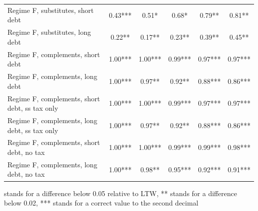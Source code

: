 \documentclass[letterpaper,12pt]{article}%
\begin{document}
\begin{table}[H]
\begin{threeparttable}
\begin{tabular}{l c c c c c}
     \quad Regime F, substitutes, short debt &  0.43*** & 0.51*  & 0.68*  & 0.79** & 0.81**  \\
     \quad Regime F, substitutes, long debt &  0.22**  & 0.17**  & 0.23** &  0.39**  & 0.45** \\
     \quad Regime F, complements, short debt &   1.00*** & 1.00*** & 0.99*** & 0.97*** & 0.97***  \\
     \quad Regime F, complements, long debt &  1.00*** & 0.97**  & 0.92** &  0.88*** & 0.86***  \\
     \quad Regime F, complements, short debt, ss tax only &  1.00***   &   1.00*** & 0.99*** & 0.97*** & 0.97***  \\
     \quad Regime F, complements, long debt, ss tax only &  1.00*** & 0.97** &  0.92** &  0.88*** & 0.86***\\
     \quad Regime F, complements, short debt, no tax &  1.00*** & 1.00*** &  0.99*** & 0.99***  & 0.98*** \\
     \quad Regime F, complements, long debt, no tax &   1.00*** &  0.98**  & 0.95***  & 0.92*** & 0.91***  \\
     \midrule
    \bottomrule    
    \end{tabular}
    \begin{tablenotes}
    \item * stands for a difference below 0.05 relative to LTW, ** stands for a difference below 0.02, *** stands for a correct value to the second decimal
    \end{tablenotes}
    \label{tab:PPAOutputMultipliers}
    \end{threeparttable}
\end{table}
\end{document}
